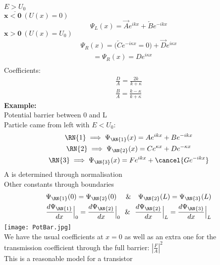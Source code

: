 \documentclass[a4paper, 11pt, fleqn, normalem]{report}
\begin{document}
$\underline{E > U_{0}}$ \\
$\mathbf{x < 0}~(U(x) = 0)$
\begin{equation*}
    \Psi_{L}(x) = \overrightarrow{A}e^{ikx} + \overleftarrow{B}e^{-ikx}
\end{equation*}
$\mathbf{x > 0}~(U(x) = U_{0})$
\begin{gather*}
    \Psi_{R}(x) = \big(\overleftarrow{C}e^{-i\kappa x} = 0\big) + \overrightarrow{D}e^{i\kappa x} \\
    ~~~~~~~~ = \Psi_{R}(x) = De^{i\kappa x} \\
\end{gather*}
Coefficients:
\begin{gather*}
    \frac{D}{A} = \frac{2k}{k + \kappa} \\
    \frac{B}{A} = \frac{k - \kappa}{k + \kappa}
\end{gather*}
\textbf{Example:} \\
Potential barrier between 0 and L \\
Particle came from left with $E < U_{0}$:
\begin{gather*}
    \RN{1} \implies \Psi_{\RN{1}}(x) = Ae^{ikx} + Be^{-ikx} \\
    \RN{2} \implies \Psi_{\RN{2}}(x) = Ce^{\kappa x} + De^{-\kappa x} \\
    \RN{3} \implies \Psi_{\RN{3}}(x) = Fe^{ikx} + \cancel{Ge^{-ikx}}
\end{gather*}
A is determined through normalisation \\
Other constants through boundaries
\begin{gather*}
    \Psi_{\RN{1}}(0) = \Psi_{\RN{2}}(0)~~~~\&~~~\Psi_{\RN{2}}(L) = \Psi_{\RN{3}}(L) \\
    \frac{d\Psi_{\RN{1}}}{dx}\Big|_{0} = \frac{d\Psi_{\RN{2}}}{dx}\Big|_{0}~~\&~~\frac{d\Psi_{\RN{2}}}{dx}\Big|_{L} = \frac{d\Psi_{\RN{3}}}{dx}\Big|_{L}
\end{gather*}
\texttt{[image: PotBar.jpg]} \\
We have the usual coefficients at $x = 0$ as well as an extra one for the transmission coefficient through the full barrier: $|\frac{F}{A}|^{2}$ \\
This is a reasonable model for a transistor
\end{document}
